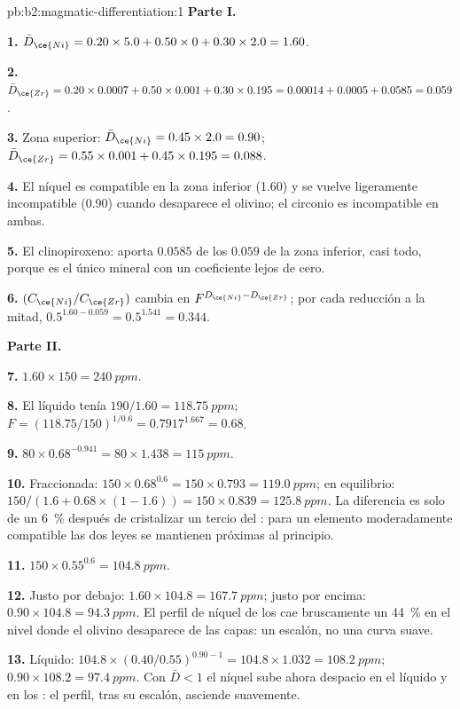 \begin{solution}{pb:b2:magmatic-differentiation:1}
\noindent\textbf{Parte I.}

\textbf{1.} $\bar D_{\ce{Ni}} = 0.20\times5.0 + 0.50\times0 + 0.30\times2.0 = 1.60$.

\textbf{2.} $\bar D_{\ce{Zr}} = 0.20\times0.0007 + 0.50\times0.001 + 0.30\times0.195 =
0.00014 + 0.0005 + 0.0585 = 0.059$.

\textbf{3.} Zona superior: $\bar D_{\ce{Ni}} = 0.45\times2.0 = 0.90$; $\bar D_{\ce{Zr}} =
0.55\times0.001 + 0.45\times0.195 = 0.088$.

\textbf{4.} El níquel es compatible en la zona inferior (1.60) y se vuelve ligeramente
incompatible (0.90) cuando desaparece el olivino; el circonio es incompatible en ambas.

\textbf{5.} El clinopiroxeno: aporta $0.0585$ de los $0.059$ de la zona inferior, casi
todo, porque es el único mineral con un coeficiente lejos de cero.

\textbf{6.} $(C_{\ce{Ni}}/C_{\ce{Zr}})$ cambia en $F^{D_{\ce{Ni}} - D_{\ce{Zr}}}$;
por cada reducción a la mitad, $0.5^{1.60 - 0.059} = 0.5^{1.541} = 0.344$.

\noindent\textbf{Parte II.}

\textbf{7.} $1.60\times150 = \qty{240}{ppm}$.

\textbf{8.} El líquido tenía $190/1.60 = \qty{118.75}{ppm}$; $F = (118.75/150)^{1/0.6} =
0.7917^{1.667} = 0.68$.

\textbf{9.} $80\times0.68^{-0.941} = 80\times1.438 = \qty{115}{ppm}$.

\textbf{10.} Fraccionada: $150\times0.68^{0.6} = 150\times0.793 = \qty{119.0}{ppm}$;
en equilibrio: $150/(1.6 + 0.68\times(1 - 1.6)) = 150\times0.839 = \qty{125.8}{ppm}$.
La diferencia es solo de un \qty{6}{\percent} después de cristalizar un tercio del
: para un elemento moderadamente compatible las dos leyes se mantienen próximas al principio.

\textbf{11.} $150\times0.55^{0.6} = \qty{104.8}{ppm}$.

\textbf{12.} Justo por debajo: $1.60\times104.8 = \qty{167.7}{ppm}$; justo por encima:
$0.90\times104.8 = \qty{94.3}{ppm}$. El perfil de níquel de los  cae
bruscamente un \qty{44}{\percent} en el nivel donde el olivino desaparece de las
capas: un escalón, no una curva suave.

\textbf{13.} Líquido: $104.8\times(0.40/0.55)^{0.90 - 1} = 104.8\times1.032 =
\qty{108.2}{ppm}$;  $0.90\times108.2 = \qty{97.4}{ppm}$. Con $\bar D < 1$
el níquel sube ahora despacio en el líquido y en los : el perfil, tras su
escalón, asciende suavemente.


\end{solution}
